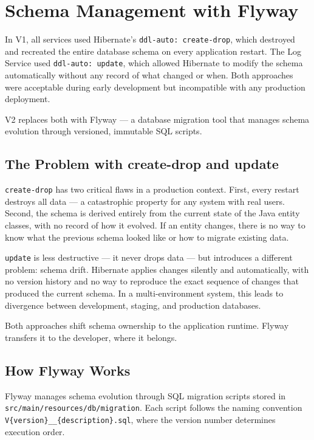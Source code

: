\section{Schema Management with Flyway}

In V1, all services used Hibernate's \texttt{ddl-auto: create-drop}, which destroyed and recreated the entire database schema on every application restart. The Log Service used \texttt{ddl-auto: update}, which allowed Hibernate to modify the schema automatically without any record of what changed or when. Both approaches were acceptable during early development but incompatible with any production deployment.

V2 replaces both with Flyway --- a database migration tool that manages schema evolution through versioned, immutable SQL scripts.

\subsection{The Problem with create-drop and update}

\texttt{create-drop} has two critical flaws in a production context. First, every restart destroys all data --- a catastrophic property for any system with real users. Second, the schema is derived entirely from the current state of the Java entity classes, with no record of how it evolved. If an entity changes, there is no way to know what the previous schema looked like or how to migrate existing data.

\texttt{update} is less destructive --- it never drops data --- but introduces a different problem: schema drift. Hibernate applies changes silently and automatically, with no version history and no way to reproduce the exact sequence of changes that produced the current schema. In a multi-environment system, this leads to divergence between development, staging, and production databases.

Both approaches shift schema ownership to the application runtime. Flyway transfers it to the developer, where it belongs.

\subsection{How Flyway Works}

Flyway manages schema evolution through SQL migration scripts stored in \texttt{src/main/resources/db/migration}. Each script follows the naming convention \texttt{V\{version\}\_\_\{description\}.sql}, where the version number determines execution order.

